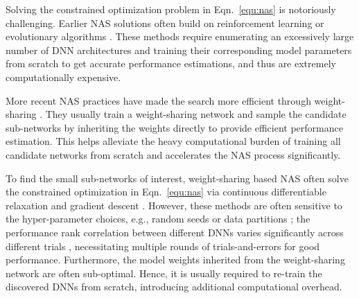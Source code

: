 \documentclass[final]{cvpr}
\theoremstyle{definition}
\begin{document}
Solving the constrained optimization problem in Eqn.~\eqref{equ:nas} is notoriously challenging. 
Earlier NAS solutions often build on reinforcement learning \cite{zoph2016neural, zoph2018learning, tan2019mnasnet, zhong2018practical} or evolutionary algorithms \cite{real2017large, real2019regularized, suganuma2018exploiting, xie2017genetic}.  
These methods require enumerating an excessively large number of DNN architectures  and training their corresponding model parameters  from scratch to get accurate performance estimations, 
and thus are extremely computationally expensive.

\iffalse
Most existing NAS methods can be grouped into two categories: directly using black-box optimization or optimizing over a proxy weight-sharing network \cite{cai2018proxylessnas, pham2018efficient, liu2018darts, wu2019fbnet}.
They first search the network architecture  and then optimize  for all candidate networks from scratch on the training set. 
Directly adopting black-box optimization, e.g. reinforcement learning \cite{zoph2016neural}
or evolutionary algorithms \cite{tan2019mnasnet}, 
is extremely time-consuming 
due to the enormous search space of possible architectures and the high cost for evaluating the performance of each candidate network.
Another approach, 
weight-sharing, aims to use almost no extra computation resources during searching.
However, it usually gives worse results than the black-box optimization approach \cite{ying2019bench}.
\fi

More recent NAS practices have made the search more efficient through weight-sharing \cite{pham2018efficient, stamoulis2019single, liu2018darts, cai2018proxylessnas}.
They usually train a weight-sharing network and sample the candidate sub-networks by inheriting the weights directly to provide efficient performance estimation.
This helps alleviate the heavy computational burden of training all candidate networks from scratch and accelerates the NAS process significantly.

To find the small sub-networks of interest, 
weight-sharing based NAS often solve the constrained optimization in Eqn.~\eqref{equ:nas} via continuous differentiable relaxation and gradient descent \cite{liu2018darts, wu2019fbnet}.  
However, these methods are often sensitive to the hyper-parameter choices, e.g., random seeds or data partitions \cite{dong2020bench, ying2019bench}; the performance rank correlation between different DNNs varies significantly across different trials \cite{yang2019evaluation}, necessitating multiple rounds of trials-and-errors for good performance.    
Furthermore, the model weights inherited from the weight-sharing network are often sub-optimal. Hence, it is usually required to re-train the discovered DNNs from scratch, introducing additional computational overhead.
\end{document}
